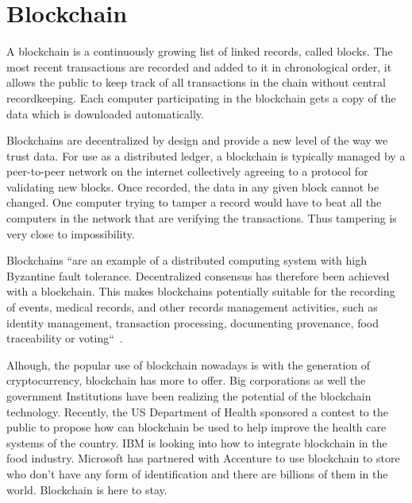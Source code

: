 \section{Blockchain}

A blockchain is a continuously growing 
list of linked records, called
blocks. The most recent transactions 
are recorded and added to it in
chronological order, it allows the 
public to keep track of all
transactions in the chain without
central recordkeeping. Each computer
participating in the blockchain gets 
a copy of the data which is
downloaded automatically.

Blockchains are decentralized by 
design and provide a new level of the
way we trust data. For use as a 
distributed ledger, a blockchain is
typically managed by a peer-to-peer 
network on the internet
collectively agreeing to a protocol 
for validating new blocks. Once
recorded, the data in any given block 
cannot be changed. One computer
trying to tamper a record would 
have to beat all the computers in the
network that are verifying the 
transactions. Thus tampering is very
close to impossibility.

Blockchains ``are an example of 
a distributed computing system with
high Byzantine fault tolerance. 
Decentralized consensus has therefore
been achieved with a blockchain. 
This makes blockchains potentially
suitable for the recording of events, 
medical records, and other
records management activities, 
such as identity management,
transaction processing, documenting 
provenance, food traceability or
voting``~\cite{hid-sp18-506-Blockchain}.

Alhough, the popular use of blockchain nowadays
is with the generation of cryptocurrency,
blockchain has more to offer. Big corporations
as well the government Institutions have been 
realizing the potential of the blockchain
technology. Recently, the US Department of
Health sponsored a contest to the public to
propose how can blockchain be used to help 
improve the health care systems of the country.
IBM is looking into how to integrate blockchain
in the food industry. Microsoft has partnered
with Accenture to use blockchain to store who
don't have any form of identification and there
are billions of them in the world. Blockchain
is here to stay.
